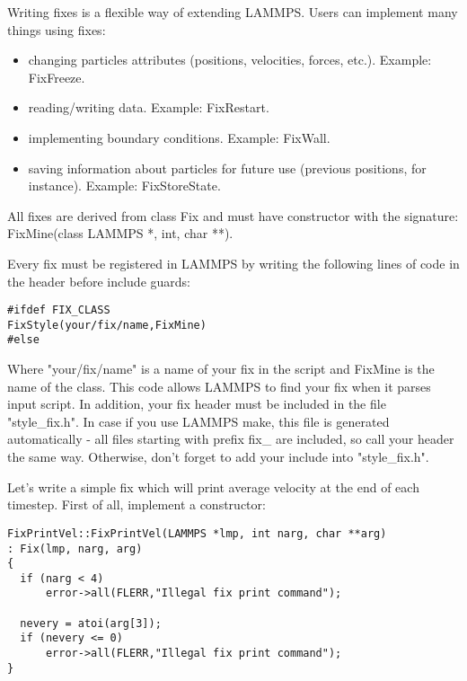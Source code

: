 \documentclass{article}
\begin{document}
Writing fixes is a flexible way of extending LAMMPS.  Users can
implement many things using fixes:

\begin{itemize}
\item changing particles attributes (positions, velocities, forces, etc.).
Example: FixFreeze.
\item reading/writing data. Example: FixRestart.
\item implementing boundary conditions. Example: FixWall.
\item saving information about particles for future use (previous positions,
for instance). Example: FixStoreState.
\end{itemize}

All fixes are derived from class Fix and must have constructor with the
signature: FixMine(class LAMMPS *, int, char **).

Every fix must be registered in LAMMPS by writing the following lines
of code in the header before include guards:

 \begin{center}
 \begin{verbatim}
#ifdef FIX_CLASS
FixStyle(your/fix/name,FixMine)
#else
  \end{verbatim}
 \end{center}

Where "your/fix/name" is a name of your fix in the script and FixMine
is the name of the class. This code allows LAMMPS to find your fix
when it parses input script. In addition, your fix header must be
included in the file "style\_fix.h". In case if you use LAMMPS make,
this file is generated automatically - all files starting with prefix
fix\_ are included, so call your header the same way. Otherwise, don't
forget to add your include into "style\_fix.h".

Let's write a simple fix which will print average velocity at the end
of each timestep. First of all, implement a constructor:

 \begin{center}
 \begin{verbatim}
FixPrintVel::FixPrintVel(LAMMPS *lmp, int narg, char **arg)
: Fix(lmp, narg, arg)
{
  if (narg < 4)
      error->all(FLERR,"Illegal fix print command");

  nevery = atoi(arg[3]);
  if (nevery <= 0)
      error->all(FLERR,"Illegal fix print command");
}
  \end{verbatim}
 \end{center}
\end{document}
